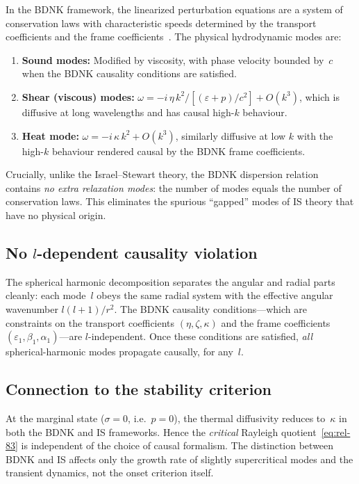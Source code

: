 In the BDNK framework, the linearized perturbation equations are a
system of conservation laws with characteristic speeds determined by
the transport coefficients and the frame
coefficients~\cite{Kovtun2019,HoultKovtun2020}.  The physical
hydrodynamic modes are:
\begin{enumerate}
\item \textbf{Sound modes:} Modified by viscosity, with phase velocity
  bounded by~$c$ when the BDNK causality conditions are satisfied.
\item \textbf{Shear (viscous) modes:}
  $\omega = -i\,\eta\,k^{2}/[(\varepsilon + p)/c^{2}] + O(k^{3})$,
  which is diffusive at long wavelengths and has causal high-$k$
  behaviour.
\item \textbf{Heat mode:}
  $\omega = -i\,\kappa\,k^{2} + O(k^{3})$,
  similarly diffusive at low $k$ with the high-$k$ behaviour
  rendered causal by the BDNK frame coefficients.
\end{enumerate}
Crucially, unlike the Israel--Stewart theory, the BDNK dispersion
relation contains \emph{no extra relaxation modes}: the number of modes
equals the number of conservation laws.  This eliminates the spurious
``gapped'' modes of IS theory that have no physical origin.

\subsection{No $l$-dependent causality violation}
\label{sec:rel-causality-angular}

The spherical harmonic decomposition separates the angular and radial
parts cleanly: each mode~$l$ obeys the same radial system with the
effective angular wavenumber $l(l+1)/r^{2}$.  The BDNK causality
conditions---which are constraints on the transport coefficients
$(\eta, \zeta, \kappa)$ and the frame coefficients
$(\varepsilon_{1}, \beta_{1}, \alpha_{1})$---are
$l$-independent.  Once these conditions are satisfied, \emph{all}
spherical-harmonic modes propagate causally, for any~$l$.

\subsection{Connection to the stability criterion}
\label{sec:rel-causality-connection}

At the marginal state ($\sigma = 0$, i.e.\ $p = 0$), the thermal
diffusivity reduces to~$\kappa$ in both the BDNK and IS frameworks.
Hence the \emph{critical} Rayleigh quotient~\eqref{eq:rel-83} is
independent of the choice of causal formalism.  The distinction between
BDNK and IS affects only the growth rate of slightly supercritical
modes and the transient dynamics, not the onset criterion itself.



